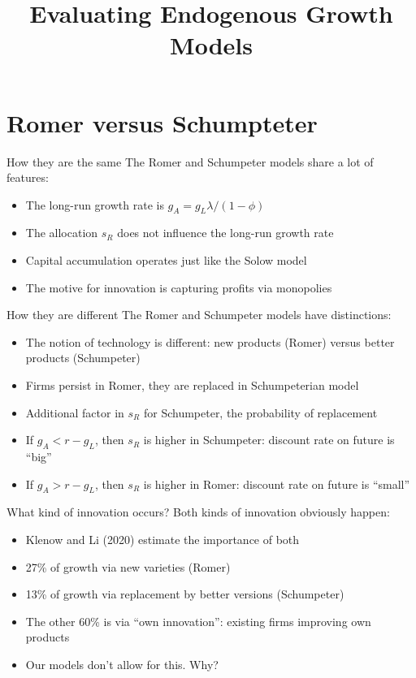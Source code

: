 

\title[Endogenous Growth]{Evaluating Endogenous Growth Models}


\maketitle

\section{Romer versus Schumpteter}
\begin{frame}{How they are the same}
The Romer and Schumpeter models share a lot of features:
\begin{itemize}
	\item The long-run growth rate is $g_A = g_L \lambda/(1-\phi)$
	\item The allocation $s_R$ does not influence the long-run growth rate
	\item Capital accumulation operates just like the Solow model
	\item The motive for innovation is capturing profits via monopolies
\end{itemize}
\end{frame}

\begin{frame}{How they are different}
The Romer and Schumpeter models have distinctions:
\begin{itemize}
	\item The notion of technology is different: new products (Romer) versus better products (Schumpeter)
	\item Firms persist in Romer, they are replaced in Schumpeterian model
	\item Additional factor in $s_R$ for Schumpeter, the probability of replacement
	\item If $g_A < r - g_L$, then $s_R$ is higher in Schumpeter: discount rate on future is ``big''
	\item If $g_A > r - g_L$, then $s_R$ is higher in Romer: discount rate on future is ``small''
\end{itemize}
\end{frame}

\begin{frame}{What kind of innovation occurs?}
Both kinds of innovation obviously happen:
\begin{itemize}
	\item Klenow and Li (2020) estimate the importance of both
	\item 27\% of growth via new varieties (Romer)
	\item 13\% of growth via replacement by better versions (Schumpeter)
	\item The other 60\% is via ``own innovation'': existing firms improving own products
	\item Our models don't allow for this. Why?
\end{itemize}
\end{frame}

